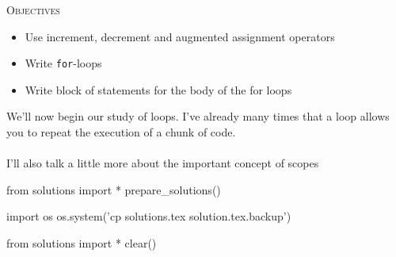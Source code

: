 \textsc{Objectives}
\begin{itemize}
\item Use increment, decrement and augmented assignment operators
\item Write \texttt{for}-loops
\item Write block of statements for the body of the for loops
\end{itemize}
We'll now begin our study of loops. I've already many times that a loop allows you to repeat the execution of a chunk of code.\\\\
I'll also talk a little more about the important concept of scopes
     
















\begin{python0}
from solutions import *
prepare_solutions()
\end{python0}
\begin{python}
import os
os.system('cp solutions.tex solution.tex.backup')  
\end{python}

\begin{python0}
from solutions import *
clear()
\end{python0}
